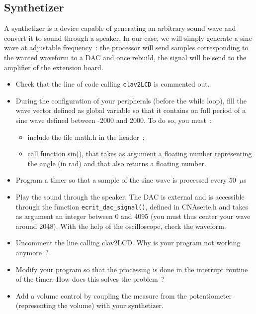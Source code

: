 \documentclass[11pt,a4paper]{article}
\theoremstyle{definition}%
\begin{document}
\subsection{Synthetizer}
A synthetizer is a device capable of generating an arbitrary sound wave and convert it to sound through a speaker.
In our case, we will simply generate a sine wave at adjustable frequency~: the processor will send samples corresponding to the wanted waveform to a DAC and once rebuild, the signal will be send to the amplifier of the extension board.
\begin{itemize}
	\item Check that the line of code calling  \texttt{clav2LCD} is commented out.
	\item During the configuration of your peripherals (before the while loop), fill the wave vector defined as global variable so that it contains on full period of a sine wave defined between -2000 and 2000.
    To do so, you must~:
	\begin{itemize}
		\item include the file math.h in the header~;
		\item call function sin(), that takes as argument a floating number representing the angle (in rad) and that also returns a floating number.
	\end{itemize}
	\item Program a timer so that a sample of the sine wave is processed every 50~$\mu$s
	\item Play the sound through the speaker. The DAC is external and is accessible through the function \texttt{ecrit\_dac\_signal()}, defined in CNAserie.h and takes as argument an integer between 0 and 4095 (you must thus center your wave around 2048).
    With the help of the oscilloscope, check the waveform.
	\item Uncomment the line calling clav2LCD.
    Why is your program not working anymore~?
	\item Modify your program so that the processing is done in the interrupt routine of the timer.
    How does this solves the problem~?
	\item Add a volume control by coupling the measure from the potentiometer (representing the volume) with your synthetizer.
\end{itemize}
\end{document}
